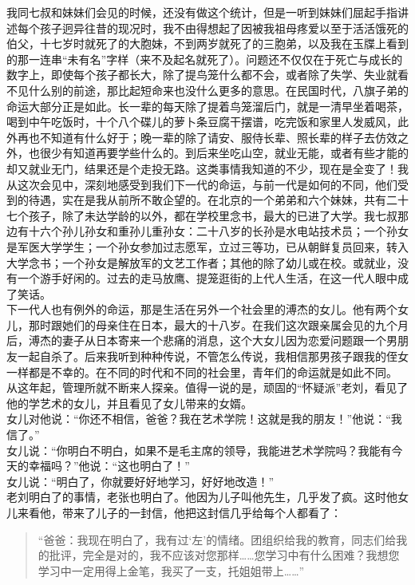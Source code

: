 我同七叔和妹妹们会见的时候，还没有做这个统计，但是一听到妹妹们屈起手指讲述每个孩子迥异往昔的现况时，我不由得想起了因被我祖母疼爱以至于活活饿死的伯父，十七岁时就死了的大胞妹，不到两岁就死了的三胞弟，以及我在玉牒上看到的那一连串“未有名”字样（来不及起名就死了）。问题还不仅仅在于死亡与成长的数字上，即使每个孩子都长大，除了提鸟笼什么都不会，或者除了失学、失业就看不见什么别的前途，那比起短命来也没什么更多的意思。在民国时代，八旗子弟的命运大部分正是如此。长一辈的每天除了提着鸟笼溜后门，就是一清早坐着喝茶，喝到中午吃饭时，十个八个碟儿的萝卜条豆腐干摆谱，吃完饭和家里人发威风，此外再也不知道有什么好于；晚一辈的除了请安、服侍长辈、照长辈的样子去仿效之外，也很少有知道再要学些什么的。到后来坐吃山空，就业无能，或者有些才能的却又就业无门，结果还是个走投无路。这类事情我知道的不少，现在是全变了！我从这次会见中，深刻地感受到我们下一代的命运，与前一代是如何的不同，他们受到的待遇，实在是我从前所不敢企望的。在北京的一个弟弟和六个妹妹，共有二十七个孩子，除了未达学龄的以外，都在学校里念书，最大的已进了大学。我七叔那边有十六个孙儿孙女和重孙儿重孙女：二十八岁的长孙是水电站技术员；一个孙女是军医大学学生；一个孙女参加过志愿军，立过三等功，已从朝鲜复员回来，转入大学念书；一个孙女是解放军的文艺工作者；其他的除了幼儿或在校。或就业，没有一个游手好闲的。过去的走马放鹰、提笼逛街的上代人生活，在这一代人眼中成了笑话。\\

下一代人也有例外的命运，那是生活在另外一个社会里的溥杰的女儿。他有两个女儿，那时跟她们的母亲住在日本，最大的十八岁。在我们这次跟亲属会见的九个月后，溥杰的妻子从日本寄来一个悲痛的消息，这个大女儿因为恋爱问题跟一个男朋友一起自杀了。后来我听到种种传说，不管怎么传说，我相信那男孩子跟我的侄女一样都是不幸的。在不同的时代和不同的社会里，青年们的命运就是如此不同。\\

从这年起，管理所就不断来人探亲。值得一说的是，顽固的“怀疑派”老刘，看见了他的学艺术的女儿，并且看见了女儿带来的女婿。\\

女儿对他说：“你还不相信，爸爸？我在艺术学院！这就是我的朋友！”他说：“我信了。”\\

女儿说：“你明白不明白，如果不是毛主席的领导，我能进艺术学院吗？我能有今天的幸福吗？”他说：“这也明白了！”\\

女儿说：“明白了，你就要好好地学习，好好地改造！”\\

老刘明白了的事情，老张也明白了。他因为儿子叫他先生，几乎发了疯。这时他女儿来看他，带来了儿子的一封信，他把这封信几乎给每个人都看了：\\

\begin{quote}
	“爸爸：我现在明白了，我有过‘左’的情绪。团组织给我的教育，同志们给我的批评，完全是对的，我不应该对您那样……您学习中有什么困难？我想您学习中一定用得上金笔，我买了一支，托姐姐带上……”\\
\end{quote}